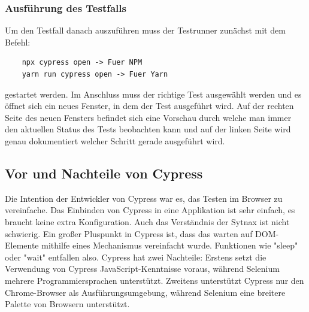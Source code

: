 \subsubsection{Ausführung des Testfalls}

Um den Testfall danach auszuführen muss der Testrunner zunächst mit dem Befehl:

\begin{lstlisting}
    npx cypress open -> Fuer NPM
    yarn run cypress open -> Fuer Yarn
\end{lstlisting}

gestartet werden.
Im Anschluss muss der richtige Test ausgewählt werden und es öffnet sich ein neues Fenster, in dem der Test ausgeführt wird. Auf der rechten Seite des neuen Fensters befindet sich eine Vorschau durch welche man immer den aktuellen Status des Tests beobachten kann und auf der linken Seite wird genau dokumentiert welcher Schritt gerade ausgeführt wird.

\subsection{Vor und Nachteile von Cypress}

Die Intention der Entwickler von Cypress war es, das Testen im Browser zu vereinfache. Das Einbinden von Cypress in eine Applikation ist sehr einfach, es braucht keine extra Konfiguration. Auch das Verständnis der Sytnax ist nicht schwierig. Ein großer Pluspunkt in Cypress ist, dass das warten auf DOM-Elemente mithilfe eines Mechanismus vereinfacht wurde. Funktionen wie "sleep" oder "wait" entfallen also.\newline
Cypress hat zwei Nachteile: Erstens setzt die Verwendung von Cypress JavaScript-Kenntnisse voraus, während Selenium mehrere Programmiersprachen unterstützt. Zweitens unterstützt Cypress nur den Chrome-Browser als Ausführungsumgebung, während Selenium eine breitere Palette von Browsern unterstützt.












